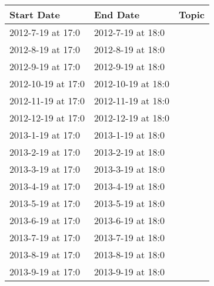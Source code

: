 \documentclass[12pt]{article}
\begin{document}
\begin{tabular}{|l|l|l|}
\hline
Start Date &End Date &Topic \\
\hline
2012-7-19 at 17:0 &2012-7-19 at 18:0 & \\
\hline
2012-8-19 at 17:0 &2012-8-19 at 18:0 & \\
\hline
2012-9-19 at 17:0 &2012-9-19 at 18:0 & \\
\hline
2012-10-19 at 17:0 &2012-10-19 at 18:0 & \\
\hline
2012-11-19 at 17:0 &2012-11-19 at 18:0 & \\
\hline
2012-12-19 at 17:0 &2012-12-19 at 18:0 & \\
\hline
2013-1-19 at 17:0 &2013-1-19 at 18:0 & \\
\hline
2013-2-19 at 17:0 &2013-2-19 at 18:0 & \\
\hline
2013-3-19 at 17:0 &2013-3-19 at 18:0 & \\
\hline
2013-4-19 at 17:0 &2013-4-19 at 18:0 & \\
\hline
2013-5-19 at 17:0 &2013-5-19 at 18:0 & \\
\hline
2013-6-19 at 17:0 &2013-6-19 at 18:0 & \\
\hline
2013-7-19 at 17:0 &2013-7-19 at 18:0 & \\
\hline
2013-8-19 at 17:0 &2013-8-19 at 18:0 & \\
\hline
2013-9-19 at 17:0 &2013-9-19 at 18:0 & \\
\hline
\end{tabular}
\end{document}
